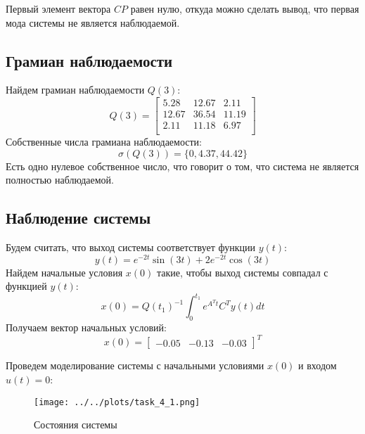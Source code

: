 Первый элемент вектора $CP$ равен нулю, откуда можно сделать вывод, что первая мода системы не является наблюдаемой. 

\subsection{Грамиан наблюдаемости}
Найдем грамиан наблюдаемости $Q(3)$:
\begin{equation}
    Q(3) = \begin{bmatrix}
        5.28  & 12.67  & 2.11 \\ 
        12.67  & 36.54  & 11.19 \\ 
        2.11  & 11.18  & 6.97 \\ 
        \end{bmatrix}
\end{equation}
Собственные числа грамиана наблюдаемости:
\begin{equation}
    \sigma(Q(3)) = \{0, 4.37, 44.42\}
\end{equation}
Есть одно нулевое собственное число, что говорит о том, что система не является полностью наблюдаемой.

\subsection{Наблюдение системы}
Будем считать, что выход системы соответствует функции $y(t)$:
\begin{equation}
    y(t) = e^{-2t} \sin(3t) +2e^{-2t} \cos(3t) 
\end{equation}
Найдем начальные условия $x(0)$ такие, чтобы выход системы совпадал с функцией $y(t)$:
\begin{equation}
    x(0) = Q(t_1)^{-1} \int_0^{t_1} e^{A^Tt}C^Ty(t)dt
\end{equation}
Получаем вектор начальных условий:
\begin{equation}
    x(0) = \begin{bmatrix}
        -0.05 & -0.13 & -0.03
    \end{bmatrix}^T
\end{equation}

Проведем моделирование системы с начальными условиями $x(0)$ и входом $u(t) = 0$: 

\begin{figure}[H]
    \centering
    \texttt{[image: ../../plots/task\_4\_1.png]}
    \caption{Состояния системы}
    \label{fig:task4_states}
\end{figure}

